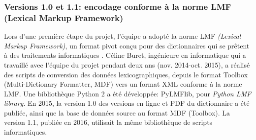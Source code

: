 

\subsubsection{Versions 1.0 et 1.1: encodage conforme à la norme LMF (Lexical Markup Framework)}

Lors d'une première étape du projet, l'équipe a adopté la norme LMF \emph{(Lexical Markup Framework)}, un format pivot conçu pour des dictionnaires qui se prêtent à des traitements informatiques \parencite{francopoulo2013,romary2013}. Céline Buret, ingénieure en informatique qui a travaillé avec l'équipe du projet pendant deux ans (nov. 2014-oct. 2015), a réalisé des scripts de conversion des données lexicographiques, depuis le format Toolbox (Multi-Dictionary Formatter, MDF) vers un format XML conforme à la norme LMF. Une bibliothèque Python 2 a été développée: PyLMFlib, pour \emph{Python LMF library}. En 2015, la version 1.0 des versions en ligne et PDF du dictionnaire a été publiée, ainsi que la base de données source au format MDF (Toolbox). La version 1.1, publiée en 2016, utilisait la même bibliothèque de scripts informatiques.

